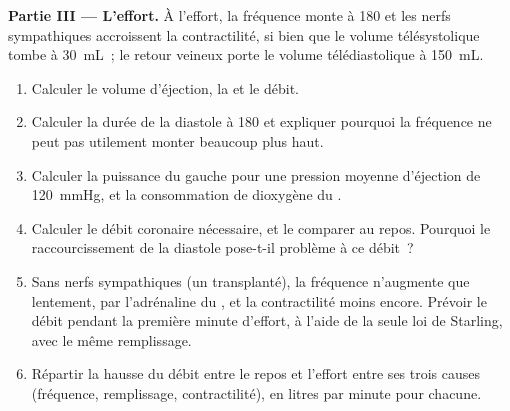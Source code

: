 \begin{problem}
\medskip
\noindent\textbf{Partie III --- L'effort.}
À l'effort, la fréquence monte à 180 et les nerfs sympathiques
accroissent la contractilité, si bien que le volume télésystolique tombe
à \qty{30}{mL}~; le retour veineux porte le volume télédiastolique à
\qty{150}{mL}.
\begin{enumerate}[resume]
  \item Calculer le volume d'éjection, la  et le
        débit.
  \item Calculer la durée de la diastole à 180 et expliquer pourquoi la
        fréquence ne peut pas utilement monter beaucoup plus haut.
  \item Calculer la puissance du  gauche pour une pression
        moyenne d'éjection de \qty{120}{mmHg}, et la consommation de
        dioxygène du .
  \item Calculer le débit coronaire nécessaire, et le comparer au repos.
        Pourquoi le raccourcissement de la diastole pose-t-il problème à
        ce débit~?
  \item Sans nerfs sympathiques (un  transplanté), la fréquence
        n'augmente que lentement, par l'adrénaline du , et la
        contractilité moins encore. Prévoir le débit pendant la première
        minute d'effort, à l'aide de la seule loi de Starling, avec le
        même remplissage.
  \item Répartir la hausse du débit entre le repos et l'effort entre ses
        trois causes (fréquence, remplissage, contractilité), en litres
        par minute pour chacune.
\end{enumerate}


\end{problem}
